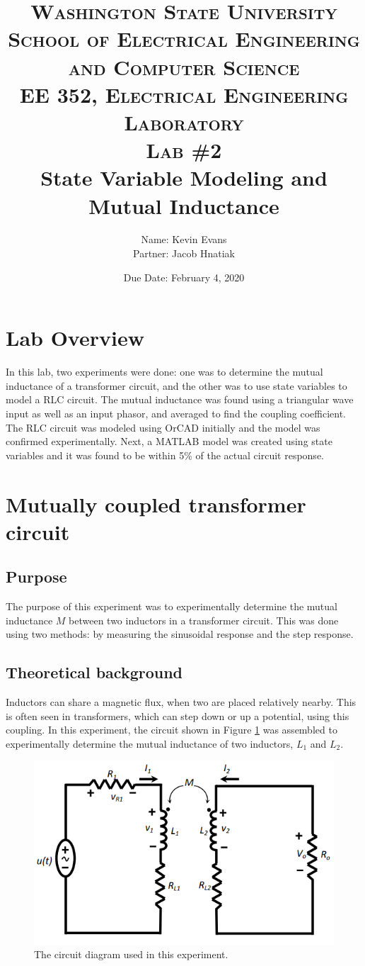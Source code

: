 \documentclass{report}
\title{
	\textsc{ \small
		Washington State University \\
		School of Electrical Engineering and Computer Science \\
		EE 352, Electrical Engineering Laboratory
	} \\
	{\textsc{\small Lab \#2}} \\
	State Variable Modeling and Mutual Inductance
}
\author{
	Name: Kevin Evans \\
	Partner: Jacob Hnatiak
}
\date{Due Date: February 4, 2020}
\begin{document}
\maketitle

\section*{Lab Overview}
In this lab, two experiments were done: one was to determine the mutual inductance of a transformer circuit, and the other was to use state variables to model a RLC circuit. The mutual inductance was found using a triangular wave input as well as an input phasor, and averaged to find the coupling coefficient. The RLC circuit was modeled using OrCAD initially and the model was confirmed experimentally. Next, a MATLAB model was created using state variables and it was found to be within 5\% of the actual circuit response.

\section{Mutually coupled transformer circuit}

\subsection{Purpose}
The purpose of this experiment was to experimentally determine the mutual inductance $M$ between two inductors in a transformer circuit. This was done using two methods: by measuring the sinusoidal response and the step response.

\subsection{Theoretical background}

Inductors can share a magnetic flux, when two are placed relatively nearby. This is often seen in transformers, which can step down or up a potential, using this coupling. In this experiment, the circuit shown in Figure \ref{fig:mutualinductors} was assembled to experimentally determine the mutual inductance of two inductors, $L_1$ and $L_2$.

\begin{figure}[h]
	\centering
	\includegraphics[width=0.6\linewidth]{mutualinductors}
	\caption{The circuit diagram used in this experiment.}
	\label{fig:mutualinductors}
\end{figure}
\end{document}
